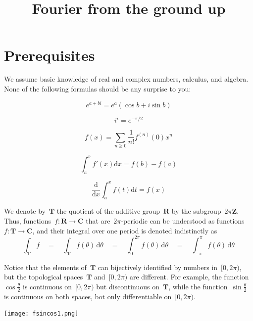\title{Fourier from the ground up}

\newcommand{\Z}{\mathbf{Z}}
\newcommand{\Q}{\mathbf{Q}}
\newcommand{\R}{\mathbf{R}}
\newcommand{\C}{\mathbf{C}}
\newcommand{\T}{\mathbf{T}}
\newcommand{\PP}{\mathcal{P}}
\newcommand{\ud}{\mathrm{d}}
\newcommand{\ds}{\displaystyle}
\newcommand{\DFT}{\mathtt{DFT}}
\newcommand{\IDFT}{\mathtt{IDFT}}

\setcounter{section}{-1}


\clearpage
\section{Prerequisites}

We assume basic knowledge of real and complex numbers, calculus, and algebra.
None of the following formulas should be any surprise to you:

$$e^{a + bi}=e^a\left(\cos b+i\sin b\right)$$

$$i^i = e^{-\pi/2}$$


$$ f(x)=
\sum_{n\ge0}\frac{1}{n!}f^{(n)}(0)x^n$$

$$ \int_a^b f'(x)\ud x = f(b) - f(a) $$

$$ \frac{\ud}{\ud x}\int_a^x f(t)\ud t = f(x) $$

\vfill

We denote by~$\T$ the quotient of the additive group~$\R$ by the
subgroup~$2\pi\Z$.  Thus, functions~$f:\R\to\C$ that are~$2\pi$-periodic can
be understood as functions~$f:\T\to\C$, and their integral over one period is
denoted indistinctly as
$$
\int_\T f
\quad = \quad
\int_\T f(\theta)\,\ud\theta
\quad = \quad
\int_0^{2\pi} f(\theta)\,\ud\theta
\quad = \quad
\int_{-\pi}^{\pi} f(\theta)\,\ud\theta
$$

Notice that the elements of~$\T$ can bijectively identified by numbers
in~$[0,2\pi)$, but the topological spaces~$\T$ and~$[0,2\pi)$ are different.
For example, the function~$\cos\frac\theta2$ is continuous on~$[0,2\pi)$
but discontinuous on~$\T$, while the function~$\sin\frac\theta2$ is
continuous on both spaces, bot only differentiable on~$[0,2\pi)$.

\texttt{[image: fsincos1.png]}

